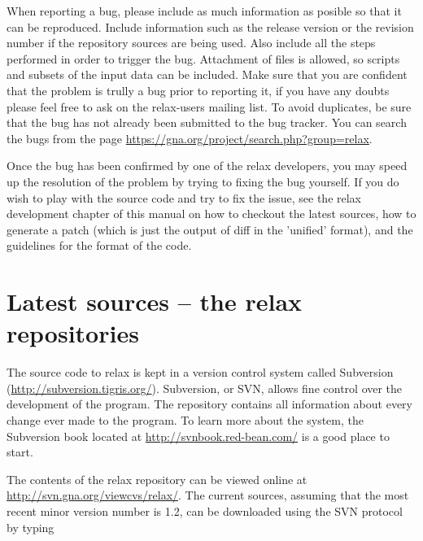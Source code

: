 When reporting a bug, please include as much information as posible so that it can be reproduced.  Include information such as the release version or the revision number if the repository sources are being used.  Also include all the steps performed in order to trigger the bug.  Attachment of files is allowed, so scripts and subsets of the input data can be included.  Make sure that you are confident that the problem is trully a bug prior to reporting it, if you have any doubts please feel free to ask on the relax-users mailing list.  To avoid duplicates, be sure that the bug has not already been submitted to the bug tracker.  You can search the bugs from the page \href{https://gna.org/project/search.php?group=relax}{https://gna.org/project/search.php?group=relax}.

Once the bug has been confirmed by one of the relax developers, you may speed up the resolution of the problem by trying to fixing the bug yourself.  If you do wish to play with the source code and try to fix the issue, see the relax development chapter of this manual on how to checkout the latest sources, how to generate a patch (which is just the output of diff in the 'unified' format), and the guidelines for the format of the code.




\section{Latest sources -- the relax repositories}

The source code to relax is kept in a version control system called Subversion (\href{http://subversion.tigris.org/}{http://subversion.tigris.org/}).  Subversion, or SVN, allows fine control over the development of the program.  The repository contains all information about every change ever made to the program.  To learn more about the system, the Subversion book located at \href{http://svnbook.red-bean.com/}{http://svnbook.red-bean.com/} is a good place to start.

The contents of the relax repository can be viewed online at \href{http://svn.gna.org/viewcvs/relax/}{http://svn.gna.org/viewcvs/relax/}.  The current sources, assuming that the most recent minor version number is 1.2, can be downloaded using the SVN protocol by typing


